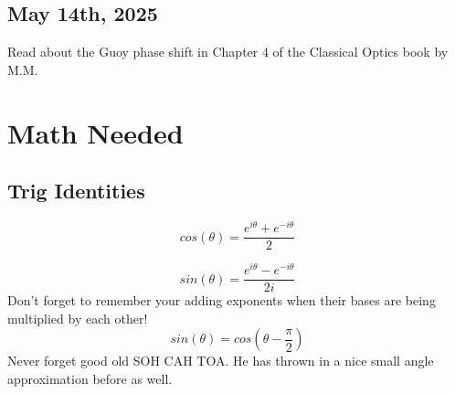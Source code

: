 \documentclass{article}
\begin{document}
\subsection{May 14th, 2025}
Read about the Guoy phase shift in Chapter 4 of the Classical Optics book by M.M.



















\section{Math Needed}
\subsection{Trig Identities}
\begin{equation}
    cos(\theta)= \frac{e^{i \theta}+e^{-i \theta}}{2}
\end{equation}

\begin{equation}
    sin(\theta)= \frac{e^{i \theta}-e^{-i \theta}}{2i}
\end{equation}
Don't forget to remember your adding exponents when their bases are being multiplied by each other!
\begin{equation}
    sin(\theta)= cos(\theta - \frac{\pi}{2}) 
\end{equation}
Never forget good old SOH CAH TOA. 
He has thrown in a nice small angle approximation before as well. 
\end{document}
